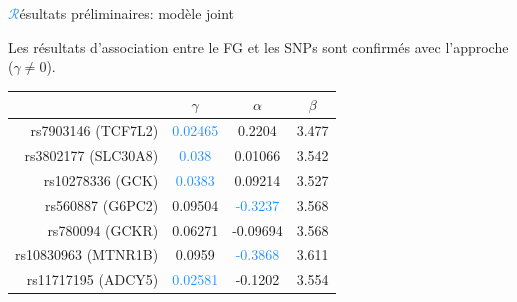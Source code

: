 \begin{frame}{{\huge\textcolor{dodgerblue}{$\mathcal{R}$}}ésultats préliminaires: modèle joint}
\par{Les résultats d'association entre le \textcolor{springgreen3}{FG} et les \textcolor{springgreen3}{SNP}s
sont confirmés avec l'approche  (\textcolor{springgreen3}{$\gamma\neq0$}).
\begin{center}
    \begin{tabular}{rccc}
        \hline
        & $\gamma$ & $\alpha$ & $\beta$ \\
        \hline
        rs7903146 (TCF7L2) & \textcolor{dodgerblue}{0.02465} & 0.2204 & \textcolor{firebrick2}{3.477} \\
        rs3802177 (SLC30A8) & \textcolor{dodgerblue}{0.038} & 0.01066 & \textcolor{firebrick2}{3.542} \\
        rs10278336 (GCK) & \textcolor{dodgerblue}{0.0383} & 0.09214 & \textcolor{firebrick2}{3.527} \\
        rs560887 (G6PC2) & \textcolor{firebrick2}{0.09504} & \textcolor{dodgerblue}{-0.3237} & \textcolor{firebrick2}{3.568} \\
        rs780094 (GCKR) & \textcolor{firebrick2}{0.06271} & -0.09694 & \textcolor{firebrick2}{3.568} \\
        rs10830963 (MTNR1B) & \textcolor{firebrick2}{0.0959} & \textcolor{dodgerblue}{-0.3868} & \textcolor{firebrick2}{3.611} \\
        rs11717195 (ADCY5) & \textcolor{dodgerblue}{0.02581} & -0.1202 & \textcolor{firebrick2}{3.554} \\
        \hline
    \end{tabular}
\end{center}
}
\end{frame}

